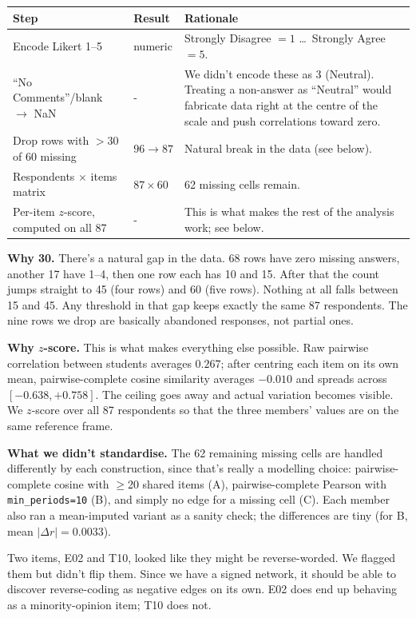 \documentclass[10pt,a4paper]{article}
\begin{document}
\begin{table}[h]
\centering
\small
\begin{tabular}{@{}llp{8.6cm}@{}}
\toprule
\textbf{Step} & \textbf{Result} & \textbf{Rationale} \\
\midrule
Encode Likert 1--5 & numeric & Strongly Disagree $=1$ \dots\ Strongly Agree $=5$. \\
``No Comments''/blank $\to$ NaN & - & We didn't encode these as 3 (Neutral). Treating a non-answer as
``Neutral'' would fabricate data right at the centre of the scale and push
correlations toward zero. \\
Drop rows with $>30$ of 60 missing & $96 \to 87$ & Natural break in the data (see below). \\
Respondents $\times$ items matrix & $87 \times 60$ & 62 missing cells remain. \\
Per-item $z$-score, computed on all 87 & - & This is what makes the rest of the analysis work; see below. \\
\bottomrule
\end{tabular}
\end{table}

\textbf{Why 30.} There's a natural gap in the data. 68 rows have zero missing answers,
another 17 have 1--4, then one row each has 10 and 15. After that the count jumps
straight to 45 (four rows) and 60 (five rows). Nothing at all falls between 15 and 45.
Any threshold in that gap keeps exactly the same 87 respondents. The nine rows we
drop are basically abandoned responses, not partial ones.

\textbf{Why $z$-score.} This is what makes everything else possible.
Raw pairwise correlation between students averages $0.267$; after centring each item on
its own mean, pairwise-complete cosine similarity averages $-0.010$ and spreads across
$[-0.638, +0.758]$. The ceiling goes away and actual variation becomes visible.
We $z$-score over all 87 respondents so that the three members' values are on the
same reference frame.

\textbf{What we didn't standardise.} The 62 remaining missing cells are handled
differently by each construction, since that's really a modelling choice:
pairwise-complete cosine with $\geq$20 shared items (A),
pairwise-complete Pearson with \texttt{min\_periods=10} (B), and simply no edge for a
missing cell (C). Each member also ran a mean-imputed variant as a sanity check;
the differences are tiny (for B, mean $|\Delta r| = 0.0033$).

Two items, E02 and T10, looked like they might be reverse-worded. We flagged them but
didn't flip them. Since we have a signed network, it should be able to discover
reverse-coding as negative edges on its own.
E02 does end up behaving as a minority-opinion item; T10 does not.
\end{document}
